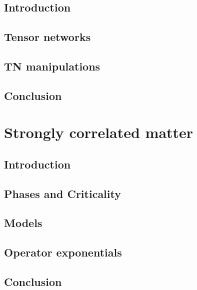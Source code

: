 \documentclass{book}
\newcounter{a}
\newcounter{b}
\begin{document}
\section{Introduction}


\section{Tensor networks}


\section{\Gls{TN} manipulations}\label{sec:mpomath}




\section{Conclusion}


\chapter{Strongly correlated matter}\label{chap3}

\section{Introduction}


\section{Phases and Criticality} \label{sec:PhasesAndCrit}


\section{Models}


\section{Operator exponentials}


\section{Conclusion}

\end{document}
